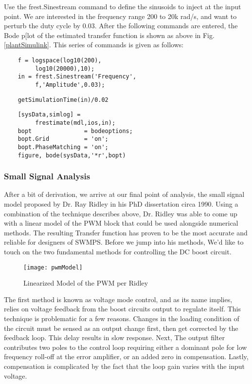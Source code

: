 Use the frest.Sinestream command to define the sinusoids to inject at the input point. We are interested in the frequency range 200 to 20k rad/s, and want to perturb the duty cycle by 0.03. After the following commands are entered, the Bode p[lot of the estimated transfer function is shown as above in Fig. \ref{plantSimulink}. This series of commands is given as follows:

\begin{verbatim}
	f = logspace(log10(200),
         log10(20000),10);
	in = frest.Sinestream('Frequency',
         f,'Amplitude',0.03);
\end{verbatim}

\begin{verbatim}
	getSimulationTime(in)/0.02
\end{verbatim}

\begin{verbatim}
	[sysData,simlog] = 
         frestimate(mdl,ios,in);
	bopt               = bodeoptions;
	bopt.Grid          = 'on';
	bopt.PhaseMatching = 'on';
	figure, bode(sysData,'*r',bopt)
\end{verbatim}

\subsubsection{Small Signal Analysis}
After a bit of derivation, we arrive at our final point of analysis, the small signal model proposed by Dr. Ray Ridley in his PhD dissertation circa 1990. Using a combination of the technique describes above, Dr. Ridley was able to come up with a linear model of the PWM block that could be used alongside numerical methods. The resulting Transfer function has proven to be the most accurate and reliable for designers of SWMPS. Before we jump into his methods, We'd like to touch on the two fundamental methods for controlling the DC boost circuit.
 
 \begin{figure}[htbp]
\begin{center}
\texttt{[image: pwmModel]}
\caption{Linearized Model of the PWM per Ridley\cite{ridley}}
\label{pwmModel}
\end{center}
\end{figure}

The first method is known as voltage mode control, and as its name implies, relies on voltage feedback from the boost circuits output to regulate itself. This technique is problematic for a few reasons. Changes in the loading condition of the circuit must be sensed as an output change first, then get corrected by the feedback loop. This delay results in slow response. Next, The output filter contributes two poles to the control loop requiring either a dominant pole for low frequency roll-off at the error amplifier, or an added zero in compensation.
Lastly, compensation is complicated by the fact that the loop gain varies with the input voltage.

